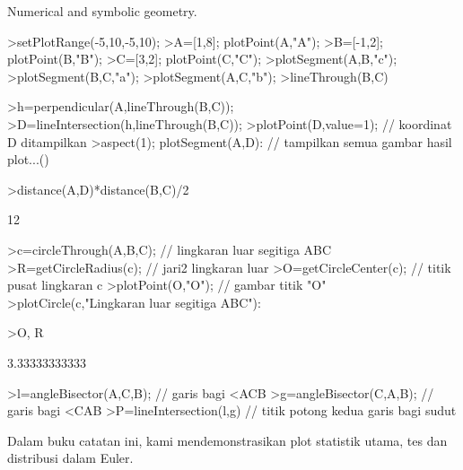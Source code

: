 \documentclass[a4paper,10pt]{article}
\begin{document}
\begin{eulernotebook}
\begin{eulercomment}
\begin{eulercomment}
\begin{eulercomment}
\begin{eulercomment}
\begin{eulercomment}
\begin{eulercomment}
\begin{eulercomment}
\begin{eulercomment}
\begin{eulercomment}
\begin{eulercomment}
\begin{eulercomment}
\begin{eulercomment}
\begin{eulercomment}
\begin{eulercomment}
\begin{eulercomment}
\begin{eulercomment}
\begin{eulercomment}
\begin{eulercomment}
\begin{euleroutput}
  Numerical and symbolic geometry.
\end{euleroutput}
\begin{eulerprompt}
>setPlotRange(-5,10,-5,10);
>A=[1,8]; plotPoint(A,"A");
>B=[-1,2]; plotPoint(B,"B");
>C=[3,2]; plotPoint(C,"C");
>plotSegment(A,B,"c");
>plotSegment(B,C,"a");
>plotSegment(A,C,"b");
>lineThrough(B,C)
\end{eulerprompt}
\begin{euleroutput}
  [0,  4,  8]
\end{euleroutput}
\begin{eulerprompt}
>h=perpendicular(A,lineThrough(B,C));
>D=lineIntersection(h,lineThrough(B,C));
>plotPoint(D,value=1); // koordinat D ditampilkan
>aspect(1); plotSegment(A,D): // tampilkan semua gambar hasil plot...()
\end{eulerprompt}
\begin{eulerprompt}
>distance(A,D)*distance(B,C)/2
\end{eulerprompt}
\begin{euleroutput}
  12
\end{euleroutput}
\begin{eulerprompt}
>c=circleThrough(A,B,C); // lingkaran luar segitiga ABC
>R=getCircleRadius(c); // jari2 lingkaran luar
>O=getCircleCenter(c); // titik pusat lingkaran c
>plotPoint(O,"O"); // gambar titik "O"
>plotCircle(c,"Lingkaran luar segitiga ABC"):
\end{eulerprompt}
\begin{eulerprompt}
>O, R
\end{eulerprompt}
\begin{euleroutput}
  [1,  4.66667]
  3.33333333333
\end{euleroutput}
\begin{eulerprompt}
>l=angleBisector(A,C,B); // garis bagi <ACB
>g=angleBisector(C,A,B); // garis bagi <CAB
>P=lineIntersection(l,g) // titik potong kedua garis bagi sudut
\end{eulerprompt}
\begin{euleroutput}
  [1,  3.44152]
\end{euleroutput}
\begin{eulercomment}
Dalam buku catatan ini, kami mendemonstrasikan plot statistik utama,
tes dan distribusi dalam Euler.


\end{eulercomment}
\end{eulercomment}
\end{eulercomment}
\end{eulercomment}
\end{eulercomment}
\end{eulercomment}
\end{eulercomment}
\end{eulercomment}
\end{eulercomment}
\end{eulercomment}
\end{eulercomment}
\end{eulercomment}
\end{eulercomment}
\end{eulercomment}
\end{eulercomment}
\end{eulercomment}
\end{eulercomment}
\end{eulercomment}
\end{eulercomment}
\end{eulernotebook}
\end{document}
